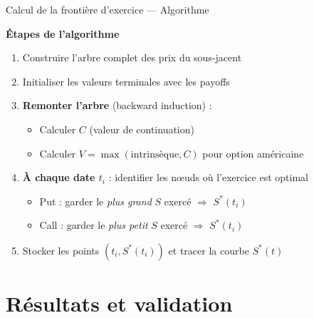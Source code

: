 \documentclass[aspectratio=169]{beamer}
\begin{document}
\begin{frame}{Calcul de la frontière d'exercice --- Algorithme}
  \small
  
  \textbf{Étapes de l'algorithme}
  \begin{enumerate}\scriptsize
    \item Construire l'arbre complet des prix du sous-jacent
    \item Initialiser les valeurs terminales avec les payoffs
    \item \textbf{Remonter l'arbre} (backward induction) :
    \begin{itemize}\scriptsize
      \item Calculer $C$ (valeur de continuation)
      \item Calculer $V = \max(\text{intrinsèque}, C)$ pour option américaine
    \end{itemize}
    \item \textbf{À chaque date $t_i$} : identifier les nœuds où l'exercice est optimal
    \begin{itemize}\scriptsize
      \item Put : garder le \emph{plus grand} $S$ exercé $\Rightarrow$ $S^*(t_i)$
      \item Call : garder le \emph{plus petit} $S$ exercé $\Rightarrow$ $S^*(t_i)$
    \end{itemize}
    \item Stocker les points $(t_i, S^*(t_i))$ et tracer la courbe $S^*(t)$
  \end{enumerate}
\end{frame}

\section{Résultats et validation}
\end{document}
